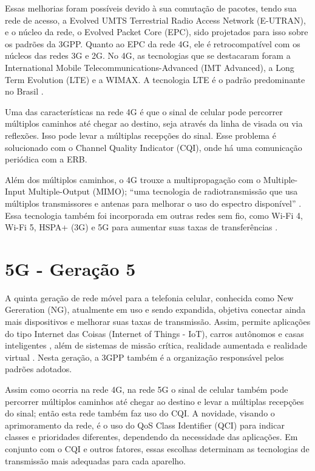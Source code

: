 \documentclass[11pt,oneside,a4paper]{abntex2}
\begin{document}
Essas melhorias foram possíveis devido à sua comutação de pacotes, tendo sua rede de acesso, a Evolved UMTS Terrestrial Radio Access Network (E-UTRAN), e o núcleo da rede, o Evolved Packet Core (EPC), sido projetados para isso sobre os padrões da 3GPP. Quanto ao EPC da rede 4G, ele é retrocompatível com os núcleos das redes 3G e 2G. No 4G, as tecnologias que se destacaram foram a International Mobile Telecommunications-Advanced (IMT Advanced), a Long Term Evolution (LTE) \cite{aula5} e a WIMAX. A tecnologia LTE é o padrão predominante no Brasil \cite{tcc2}.

Uma das características na rede 4G é que o sinal de celular pode percorrer múltiplos caminhos até chegar ao destino, seja através da linha de visada ou via reflexões. Isso pode levar a múltiplas recepções do sinal. Esse problema é solucionado com o Channel Quality Indicator (CQI), onde há uma comunicação periódica com a ERB.

Além dos múltiplos caminhos, o 4G trouxe a multipropagação com o Multiple-Input Multiple-Output (MIMO); ``uma tecnologia de radiotransmissão que usa múltiplos transmissores e antenas para melhorar o uso do espectro disponível'' \cite{aula5}. Essa tecnologia também foi incorporada em outras redes sem fio, como Wi-Fi 4, Wi-Fi 5, HSPA+ (3G) e 5G \cite{mimo} para aumentar suas taxas de transferências \cite{tcc2}.

\section*{5G - Geração 5}
\label{5g}

A quinta geração de rede móvel para a telefonia celular, conhecida como New Gereration (NG), atualmente em uso e sendo expandida, objetiva conectar ainda mais dispositivos e melhorar suas taxas de transmissão. Assim, permite aplicações do tipo Internet das Coisas (Internet of Things - IoT), carros autônomos e casas inteligentes \cite{tcc2}, além de sistemas de missão crítica, realidade aumentada e realidade virtual \cite{aula6}. Nesta geração, a 3GPP também é a organização responsável pelos padrões adotados.

Assim como ocorria na rede 4G, na rede 5G o sinal de celular também pode percorrer múltiplos caminhos até chegar ao destino e levar a múltiplas recepções do sinal; então esta rede também faz uso do CQI. A novidade, visando o aprimoramento da rede, é o uso do QoS Class Identifier (QCI) para indicar classes e prioridades diferentes, dependendo da
necessidade das aplicações. Em conjunto com o CQI e outros fatores,  essas escolhas determinam as tecnologias de transmissão mais adequadas para cada aparelho.
\end{document}
